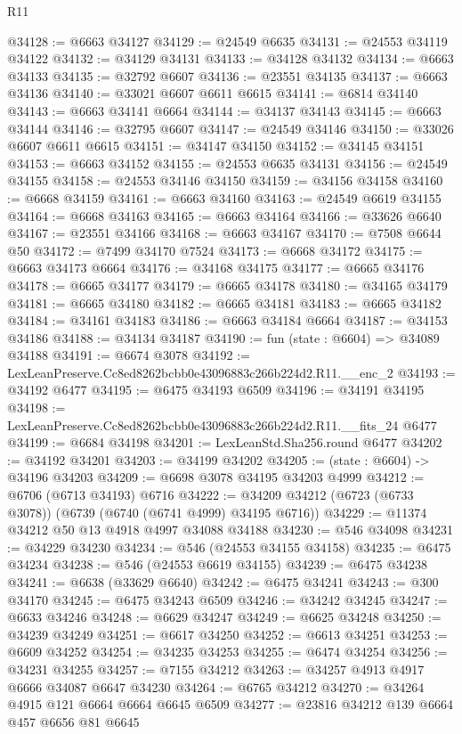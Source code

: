 \begin{lexlean}{R11}
\begin{coremodule}
@34128 := @6663 @34127
@34129 := @24549 @6635
@34131 := @24553 @34119 @34122
@34132 := @34129 @34131
@34133 := @34128 @34132
@34134 := @6663 @34133
@34135 := @32792 @6607
@34136 := @23551 @34135
@34137 := @6663 @34136
@34140 := @33021 @6607 @6611 @6615
@34141 := @6814 @34140
@34143 := @6663 @34141 @6664
@34144 := @34137 @34143
@34145 := @6663 @34144
@34146 := @32795 @6607
@34147 := @24549 @34146
@34150 := @33026 @6607 @6611 @6615
@34151 := @34147 @34150
@34152 := @34145 @34151
@34153 := @6663 @34152
@34155 := @24553 @6635 @34131
@34156 := @24549 @34155
@34158 := @24553 @34146 @34150
@34159 := @34156 @34158
@34160 := @6668 @34159
@34161 := @6663 @34160
@34163 := @24549 @6619 @34155
@34164 := @6668 @34163
@34165 := @6663 @34164
@34166 := @33626 @6640
@34167 := @23551 @34166
@34168 := @6663 @34167
@34170 := @7508 @6644 @50
@34172 := @7499 @34170 @7524
@34173 := @6668 @34172
@34175 := @6663 @34173 @6664
@34176 := @34168 @34175
@34177 := @6665 @34176
@34178 := @6665 @34177
@34179 := @6665 @34178
@34180 := @34165 @34179
@34181 := @6665 @34180
@34182 := @6665 @34181
@34183 := @6665 @34182
@34184 := @34161 @34183
@34186 := @6663 @34184 @6664
@34187 := @34153 @34186
@34188 := @34134 @34187
@34190 := fun (state : @6604) => @34089 @34188
@34191 := @6674 @3078
@34192 := LexLeanPreserve.Cc8ed8262bcbb0e43096883c266b224d2.R11.__enc_2
@34193 := @34192 @6477
@34195 := @6475 @34193 @6509
@34196 := @34191 @34195
@34198 := LexLeanPreserve.Cc8ed8262bcbb0e43096883c266b224d2.R11.__fits_24 @6477
@34199 := @6684 @34198
@34201 := LexLeanStd.Sha256.round @6477
@34202 := @34192 @34201
@34203 := @34199 @34202
@34205 := (state : @6604) -> @34196 @34203
@34209 := @6698 @3078 @34195 @34203 @4999
@34212 := @6706 (@6713 @34193) @6716
@34222 := @34209 @34212 (@6723 (@6733 @3078)) (@6739 (@6740 (@6741 @4999) @34195 @6716))
@34229 := @11374 @34212 @50 @13 @4918 @4997 @34088 @34188
@34230 := @546 @34098
@34231 := @34229 @34230
@34234 := @546 (@24553 @34155 @34158)
@34235 := @6475 @34234
@34238 := @546 (@24553 @6619 @34155)
@34239 := @6475 @34238
@34241 := @6638 (@33629 @6640)
@34242 := @6475 @34241
@34243 := @300 @34170
@34245 := @6475 @34243 @6509
@34246 := @34242 @34245
@34247 := @6633 @34246
@34248 := @6629 @34247
@34249 := @6625 @34248
@34250 := @34239 @34249
@34251 := @6617 @34250
@34252 := @6613 @34251
@34253 := @6609 @34252
@34254 := @34235 @34253
@34255 := @6474 @34254
@34256 := @34231 @34255
@34257 := @7155 @34212
@34263 := @34257 @4913 @4917 @6666 @34087 @6647 @34230
@34264 := @6765 @34212
@34270 := @34264 @4915 @121 @6664 @6664 @6645 @6509
@34277 := @23816 @34212 @139 @6664 @457 @6656 @81 @6645

\end{coremodule}
\end{lexlean}
